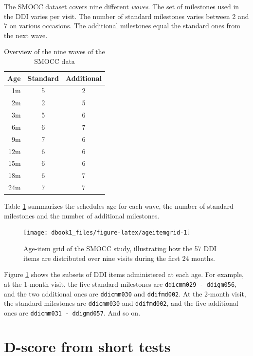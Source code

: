 \documentclass[
]{book}
\begin{document}
The SMOCC dataset covers nine different \emph{waves}. The set of milestones used in the DDI varies per visit. The number of standard milestones varies between 2 and 7 on various occasions. The additional milestones equal the standard ones from the next wave.

\begin{table}

\caption{\label{tab:tableSMOCC}Overview of the nine waves of the SMOCC data}
\centering
\begin{tabular}[t]{rcc}
\toprule
Age & Standard & Additional\\
\midrule
1m & 5 & 2\\
2m & 2 & 5\\
3m & 5 & 6\\
6m & 6 & 7\\
9m & 7 & 6\\
\addlinespace
12m & 6 & 6\\
15m & 6 & 6\\
18m & 6 & 7\\
24m & 7 & 7\\
\bottomrule
\end{tabular}
\end{table}

Table \ref{tab:tableSMOCC} summarizes the schedules age for each wave, the number of standard milestones and the number of additional milestones.

\begin{figure}

{\centering \texttt{[image: dbook1\_files/figure-latex/ageitemgrid-1]} 

}

\caption{Age-item grid of the SMOCC study, illustrating how the 57 DDI items are distributed over nine visits during the first 24 months.}\label{fig:ageitemgrid}
\end{figure}



Figure \ref{fig:ageitemgrid} shows the subsets of DDI items administered at each age. For example, at the 1-month visit, the five standard milestones are \texttt{ddicmm029\ -\ ddigm056}, and the two additional ones are \texttt{ddicmm030} and \texttt{ddifmd002}. At the 2-month visit, the standard milestones are \texttt{ddicmm030} and \texttt{ddifmd002}, and the five additional ones are \texttt{ddicmm031\ -\ ddigmd057}. And so on.

\hypertarget{sec:comparingd}{%
\section{D-score from short tests}\label{sec:comparingd}}
\end{document}
